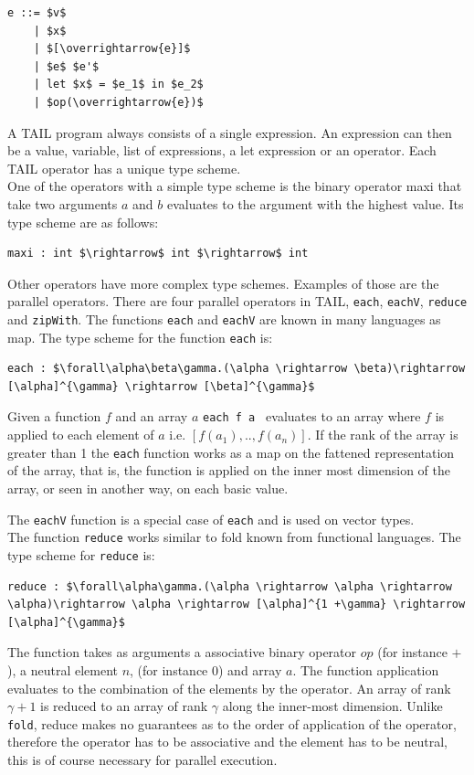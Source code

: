 \documentclass[11pt]{article}
\begin{document}
\begin{lstlisting}[numbers=none,frame=none]
e ::= $v$ 
    | $x$ 
    | $[\overrightarrow{e}]$ 
    | $e$ $e'$ 
    | let $x$ = $e_1$ in $e_2$ 
    | $op(\overrightarrow{e})$
\end{lstlisting}
A TAIL program always consists of a single expression. An expression can then be a value, variable, 
list of expressions, a let expression or an operator. Each TAIL operator has a unique type scheme. \\

One of the operators with a simple type scheme is the binary operator maxi that take two arguments $a$ and $b$ evaluates to the argument with the highest value. Its type scheme are as follows:
\begin{lstlisting}[numbers=none,frame=none]
maxi : int $\rightarrow$ int $\rightarrow$ int
\end{lstlisting}

Other operators have more complex type schemes. Examples of those are the parallel operators. 
There are four parallel operators in TAIL, {\tt each}, {\tt eachV}, {\tt reduce} and {\tt zipWith}.
The functions {\tt each} and {\tt eachV} are known in many languages as map.
The type scheme for the function {\tt each} is:
\begin{lstlisting}[numbers=none,frame=none]
each : $\forall\alpha\beta\gamma.(\alpha \rightarrow \beta)\rightarrow [\alpha]^{\gamma} \rightarrow [\beta]^{\gamma}$
\end{lstlisting}
Given a function $f$ and an array $a$ {\tt each f a } evaluates to an array where $f$ is applied to each element of $a$ i.e. $[f(a_1),..,f(a_n)]$.
If the rank of the array is greater than 1 the {\tt each} function works as a map on the fattened representation of the array,
that is, the function is applied on the inner most dimension of the array, or seen in another way, on each basic value.

The {\tt eachV} function is a special case of {\tt each} and is used on vector types.\\

The function {\tt reduce} works similar to fold known from functional languages. The type scheme for {\tt reduce} is:
\begin{lstlisting}[numbers=none,frame=none]
reduce : $\forall\alpha\gamma.(\alpha \rightarrow \alpha \rightarrow \alpha)\rightarrow \alpha \rightarrow [\alpha]^{1 +\gamma} \rightarrow [\alpha]^{\gamma}$
\end{lstlisting}
The function takes as arguments a associative binary operator $op$ (for instance $+$), a neutral element $n$, (for instance 0) and array $a$.
The function application evaluates to the combination of the elements by the operator.
An array of rank $\gamma+1$ is reduced to an array of rank $\gamma$ along the inner-most dimension.
Unlike {\tt fold}, reduce makes no guarantees as to the order of application of the operator, therefore the operator has to be associative and the element has to be neutral, this is of course necessary for parallel execution.\\
\end{document}
